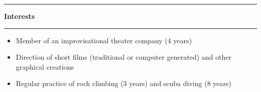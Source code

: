 \documentclass[a4paper,11pt]{article} %
\newcommand{\trad}[2]{#1}
\newcommand{\titre}[1]{%
	\begin{center}
	\rule{\textwidth}{1pt}
	\par
	\vspace{0.1cm}
        \textbf{\large #1}
	\par\rule{\textwidth}{1pt}
	\end{center}
	}
\newenvironment{customitemize}[0]
  { \begin{itemize}
    \addtolength{\itemsep}{\trad{-0.2}{0}\baselineskip}
    \addtolength{\baselineskip}{\trad{-0.2}{0}\baselineskip} }
  { \end{itemize} }
\begin{document}
\titre{\trad{Interests}{Centres d'Intérêts}}


	\begin{customitemize}
	\item \trad{Member of an improvisational theater company (4 years)}           								{Membre d'une troupe d'improvisation théatrale}
	\item \trad{Direction of short films (traditional or computer generated) and other graphical creations}   	{Réalisation de courts métrages et autres créations graphiques} %
	\item \trad{Regular practice of rock climbing (3 years) and scuba diving (8 years)}           				{Pratique régulière de l'escalade et de la plongée sous-marine}
	\end{customitemize}

	

\end{document}
